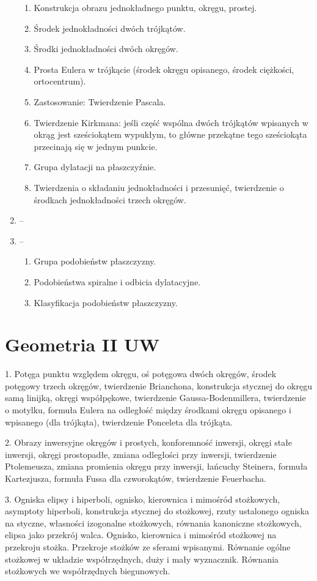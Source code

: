 \documentclass{parchment}
\begin{document}
\begin{enumerate}
\begin{enumerate}
		\item Konstrukcja obrazu jednokładnego punktu, okręgu, prostej.
		\item Środek jednokładności dwóch trójkątów.
		\item Środki jednokładności dwóch okręgów.
		\item Prosta Eulera w trójkącie (środek okręgu opisanego, środek ciężkości, ortocentrum).
		\item Zastosowanie: Twierdzenie Pascala.
		\item Twierdzenie Kirkmana: jeśli część wspólna dwóch trójkątów wpisanych w okrąg jest sześciokątem wypukłym, to główne przekątne tego sześciokąta przecinają się w jednym punkcie.
		\item Grupa dylatacji na płaszczyźnie.
		\item Twierdzenia o składaniu jednokładności i przesunięć, twierdzenie o środkach jednokładności trzech okręgów.
	\end{enumerate}
	\item -- 
	\item -- \begin{enumerate}
		\item Grupa podobieństw płaszczyzny.
		\item Podobieństwa spiralne i odbicia dylatacyjne.
		\item Klasyfikacja podobieństw płaszczyzny.
	\end{enumerate}
\end{enumerate}

\section{Geometria II UW}
1. Potęga punktu względem okręgu, oś potęgowa dwóch okręgów, środek potęgowy trzech okręgów, twierdzenie Brianchona, konstrukcja stycznej do okręgu samą linijką, okręgi współpękowe, twierdzenie Gaussa-Bodenmillera, twierdzenie o motylku, formuła Eulera na odległość między środkami okręgu opisanego i wpisanego (dla trójkąta), twierdzenie Ponceleta dla trójkąta.

2. Obrazy inwersyjne okręgów i prostych, konforemność inwersji, okręgi stałe inwersji, okręgi prostopadłe, zmiana odległości przy inwersji, twierdzenie Ptolemeusza, zmiana promienia okręgu przy inwersji, łańcuchy Steinera, formuła Kartezjusza, formuła Fussa dla czworokątów, twierdzenie Feuerbacha.

3. Ogniska elipsy i hiperboli, ognisko, kierownica i mimośród stożkowych, asymptoty hiperboli, konstrukcja stycznej do stożkowej, rzuty ustalonego ogniska na styczne, własności izogonalne stożkowych, równania kanoniczne stożkowych, elipsa jako przekrój walca. Ognisko, kierownica i mimośród stożkowej na przekroju stożka. Przekroje stożków ze sferami wpisanymi. Równanie ogólne stożkowej w układzie współrzędnych, duży i mały wyznacznik. Równania stożkowych we współrzędnych biegunowych.
\end{document}

